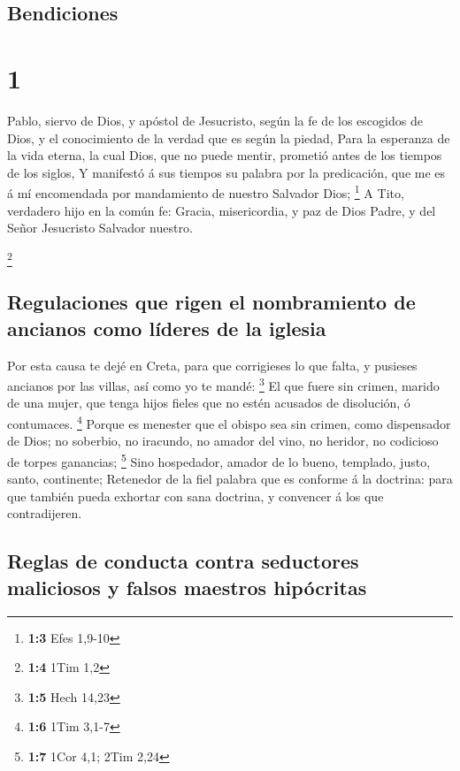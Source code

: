 \hypertarget{bendiciones}{%
\subsection{Bendiciones}\label{bendiciones}}

\hypertarget{section}{%
\section{1}\label{section}}

 Pablo, siervo de Dios, y apóstol de Jesucristo, según la
fe de los escogidos de Dios, y el conocimiento de la verdad que es según
la piedad,  Para la esperanza de la vida eterna, la cual
Dios, que no puede mentir, prometió antes de los tiempos de los siglos,
 Y manifestó á sus tiempos su palabra por la predicación,
que me es á mí encomendada por mandamiento de nuestro Salvador Dios;
\footnote{\textbf{1:3} Efes 1,9-10}  A Tito, verdadero
hijo en la común fe: Gracia, misericordia, y paz de Dios Padre, y del
Señor Jesucristo Salvador nuestro.

\footnote{\textbf{1:4} 1Tim 1,2}

\hypertarget{regulaciones-que-rigen-el-nombramiento-de-ancianos-como-luxedderes-de-la-iglesia}{%
\subsection{Regulaciones que rigen el nombramiento de ancianos como
líderes de la
iglesia}\label{regulaciones-que-rigen-el-nombramiento-de-ancianos-como-luxedderes-de-la-iglesia}}

 Por esta causa te dejé en Creta, para que corrigieses lo
que falta, y pusieses ancianos por las villas, así como yo te mandé:
\footnote{\textbf{1:5} Hech 14,23}  El que fuere sin
crimen, marido de una mujer, que tenga hijos fieles que no estén
acusados de disolución, ó contumaces. \footnote{\textbf{1:6} 1Tim 3,1-7}
 Porque es menester que el obispo sea sin crimen, como
dispensador de Dios; no soberbio, no iracundo, no amador del vino, no
heridor, no codicioso de torpes ganancias; \footnote{\textbf{1:7} 1Cor
  4,1; 2Tim 2,24}  Sino hospedador, amador de lo bueno,
templado, justo, santo, continente;  Retenedor de la fiel
palabra que es conforme á la doctrina: para que también pueda exhortar
con sana doctrina, y convencer á los que contradijeren.

\hypertarget{reglas-de-conducta-contra-seductores-maliciosos-y-falsos-maestros-hipuxf3critas}{%
\subsection{Reglas de conducta contra seductores maliciosos y falsos
maestros
hipócritas}\label{reglas-de-conducta-contra-seductores-maliciosos-y-falsos-maestros-hipuxf3critas}}


